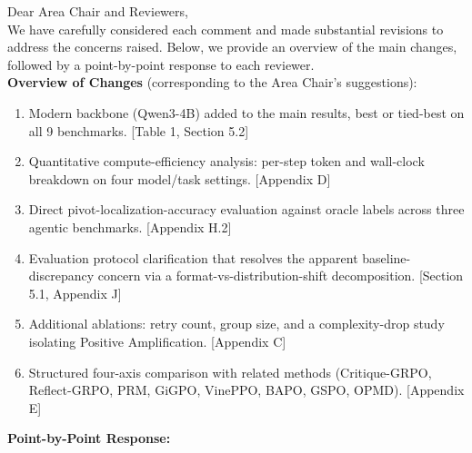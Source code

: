 \documentclass[11pt]{article}
\begin{document}
\noindent Dear Area Chair and Reviewers,\\

We have carefully considered each comment and made substantial revisions to address the concerns raised. Below, we provide an overview of the main changes, followed by a point-by-point response to each reviewer.\\

\noindent \textbf{Overview of Changes} (corresponding to the Area Chair's suggestions):
\begin{enumerate}[label=(\arabic*), itemsep=1pt]
    \item Modern backbone (Qwen3-4B) added to the main results, best or tied-best on all 9 benchmarks. [Table 1, Section 5.2]
    \item Quantitative compute-efficiency analysis: per-step token and wall-clock breakdown on four model/task settings. [Appendix D]
    \item Direct pivot-localization-accuracy evaluation against oracle labels across three agentic benchmarks. [Appendix H.2]
    \item Evaluation protocol clarification that resolves the apparent baseline-discrepancy concern via a format-vs-distribution-shift decomposition. [Section 5.1, Appendix J]
    \item Additional ablations: retry count, group size, and a complexity-drop study isolating Positive Amplification. [Appendix C]
    \item Structured four-axis comparison with related methods (Critique-GRPO, Reflect-GRPO, PRM, GiGPO, VinePPO, BAPO, GSPO, OPMD). [Appendix E]
\end{enumerate}

\noindent \textbf{Point-by-Point Response:}\\
\end{document}
